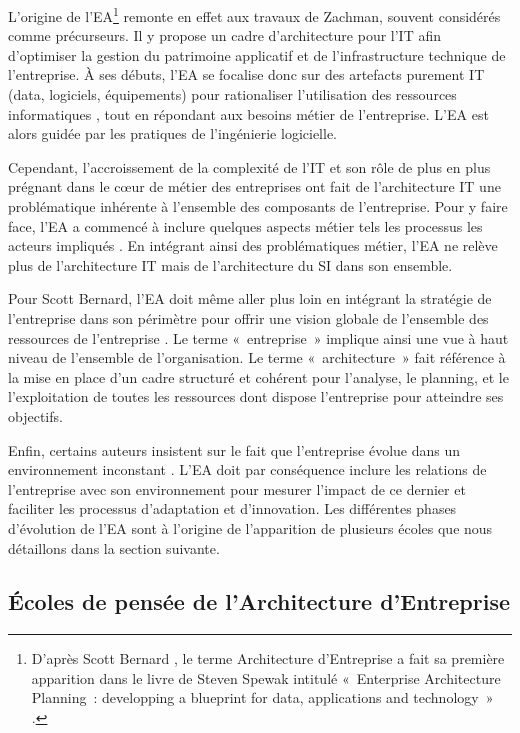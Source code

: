 L'origine de l'EA\footnote{D'après Scott Bernard
\cite{bernard2012introduction}, le terme Architecture d'Entreprise a fait sa
première apparition dans le livre de Steven Spewak intitulé «~Enterprise
Architecture Planning~: developping a blueprint for data, applications and
technology~» \cite{spewak1993enterprise}.} remonte en effet aux travaux de
Zachman, souvent considérés comme précurseurs.  Il y propose un cadre
d'architecture pour l'IT \cite{zachman1987framework} afin d'optimiser la
gestion du patrimoine applicatif et de l'infrastructure technique de
l'entreprise. À ses débuts, l'EA se focalise donc sur des artefacts purement IT
(data, logiciels, équipements) pour rationaliser l'utilisation des ressources
informatiques \cite{winter2006essential}, tout en répondant aux besoins métier
de l'entreprise. L'EA est alors guidée par les pratiques de l'ingénierie
logicielle. 

Cependant, l'accroissement de la complexité de l'IT et son rôle de plus en plus
prégnant dans le cœur de métier des entreprises
\cite{ranganathan2005enterprise} ont fait de l'architecture IT une
problématique inhérente à l'ensemble des composants de l'entreprise. Pour y
faire face, l'EA a commencé à inclure quelques aspects métier tels les
processus les acteurs impliqués \cite{winter2006essential}. En intégrant ainsi
des problématiques métier, l'EA ne relève plus de l'architecture IT mais de
l'architecture du SI dans son ensemble.

Pour Scott Bernard, l'EA doit même aller plus loin en intégrant la stratégie de
l'entreprise dans son périmètre pour offrir une vision globale de l'ensemble
des ressources de l'entreprise \cite{bernard2012introduction}. Le terme
«~entreprise~» implique ainsi une vue à haut niveau de l'ensemble de
l'organisation. Le terme «~architecture~» fait référence à la mise en place
d'un cadre structuré et cohérent pour l'analyse, le planning, et le
l'exploitation de toutes les ressources dont dispose l'entreprise pour
atteindre ses objectifs.  

Enfin, certains auteurs insistent sur le fait que l'entreprise évolue dans un
environnement inconstant \cite{lapalme2012three}. L'EA doit par conséquence
inclure les relations de l'entreprise avec son environnement pour mesurer
l'impact de ce dernier et faciliter les processus d'adaptation et d'innovation.
Les différentes phases d'évolution de l'EA sont à l'origine de l'apparition de
plusieurs écoles que nous détaillons dans la section suivante. 


\subsection{Écoles de pensée de l'Architecture d'Entreprise} 
\label{Lapalme}

